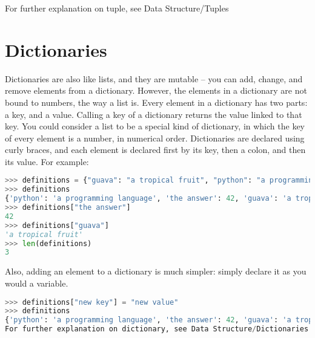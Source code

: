 For further explanation on tuple, see Data Structure/Tuples

\section{Dictionaries}
Dictionaries are also like lists, and they are mutable -- you can add, change,
and remove elements from a dictionary. However, the elements in a dictionary are
not bound to numbers, the way a list is. Every element in a dictionary has two
parts: a key, and a value. Calling a key of a dictionary returns the value
linked to that key. You could consider a list to be a special kind of
dictionary, in which the key of every element is a number, in numerical order.
Dictionaries are declared using curly braces, and each element is declared first
by its key, then a colon, and then its value. For example:
\lstset{basicstyle=\scriptsize, numbers=left, captionpos=b, tabsize=4}
\begin{lstlisting}[caption=Dictionary Definition,language={Python},
xleftmargin=15pt, label=lst:dictonarydefinition]
>>> definitions = {"guava": "a tropical fruit", "python": "a programming language", "the answer": 42}
>>> definitions
{'python': 'a programming language', 'the answer': 42, 'guava': 'a tropical fruit'}
>>> definitions["the answer"]
42
>>> definitions["guava"]
'a tropical fruit'
>>> len(definitions)    
3
\end{lstlisting}

Also, adding an element to a dictionary is much simpler: simply declare it as you would a variable.
\lstset{basicstyle=\scriptsize, numbers=left, captionpos=b, tabsize=4}
\begin{lstlisting}[caption=Dictionary Insert,language={Python},
xleftmargin=15pt, label=lst:dictionaryinsert]
>>> definitions["new key"] = "new value"
>>> definitions
{'python': 'a programming language', 'the answer': 42, 'guava': 'a tropical fruit', 'new key': 'new value'}
For further explanation on dictionary, see Data Structure/Dictionaries
\end{lstlisting}

